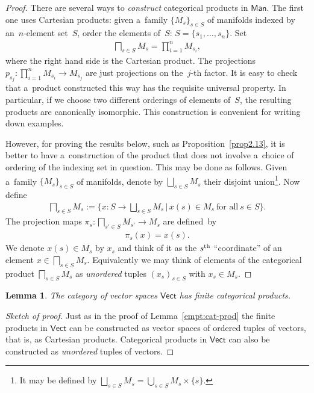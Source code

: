 \documentclass[pdftex]{sigma}
\numberwithin{equation}{section}
\newtheorem{Lemma}[Theorem]{Lemma}
\begin{document}
\begin{proof}
There are several ways to {\em construct} categorical products in $\mathsf{Man}$.
The f\/irst one uses Cartesian products: given a~family $\{M_s\}_{s\in S}$ of manifolds indexed by an~$n$-element set~$S$,
order the elements of~$S$: $S=\{s_1, \ldots, s_n\}$.
Set
\begin{gather*}
\bigsqcap_{s\in S}M_{s} = \prod\limits_{i=1}^n M_{s_i},
\end{gather*}
where the right hand side is the Cartesian product.
The projections $p_{s_j}: \prod\limits_{i=1}^n M_{s_i} \to M_{s_j} $ are just projections on the~$j$-th factor.
It is easy to check that a~product constructed this way has the requisite universal property.
In particular, if we choose two dif\/ferent orderings of elements of~$S$, the resulting products are canonically
isomorphic.
This construction is convenient for writing down examples.

However, for proving the results below, such as Proposition~\ref{prop2.13}, it is better to have a~construction of the
product that does not involve a~choice of ordering of the indexing set in question.
This may be done as follows.
Given a~family $\{M_s\}_{s\in S} $ of manifolds, denote by $\bigsqcup_{s\in S}M_s$ their disjoint union\footnote{It may
be def\/ined by $\bigsqcup\limits_{s\in S}M_s = \bigcup\limits_{s\in S} M_s\times \{s\}$.}.
Now def\/ine
\begin{gather*}
\bigsqcap_{s\in S}M_{s}:= \bigg\{x\colon S \to \bigsqcup_{s\in S}M_s \, \bigg| \,  x(s)\in M_s\ \text{for all}\ s\in S\bigg\}.
\end{gather*}
The projection maps $\pi_s\colon \bigsqcap\limits_{s'\in S}M_{s'}\to M_s$ are def\/ined~by
\begin{gather*}
\pi_s (x) = x(s).
\end{gather*}
We denote $x(s)\in M_s$ by $x_s$ and think of it as the $s^{\rm th}$ ``coordinate''
of an element $x\in \bigsqcap\limits_{s\in S}M_{s}$.
Equivalently we may think of elements of the categorical product $\bigsqcap_{s\in S}M_{s} $ as {\it unordered} tuples
$(x_s)_{s\in S}$ with $x_s\in M_s$.
\end{proof}

\begin{Lemma}
The category of vector spaces $\mathsf{Vect}$ has finite categorical products.
\label{empt:cat-prod-vect}
\end{Lemma}
\begin{proof}[Sketch of proof] Just as in the proof of Lemma~\ref{empt:cat-prod} the f\/inite products in $\mathsf{Vect}$ can be
constructed as vector spaces of ordered tuples of vectors, that is, as Cartesian products.
Categorical products in $\mathsf{Vect}$ can also be constructed as {\em unordered} tuples of vectors.
\end{proof}
\end{document}
